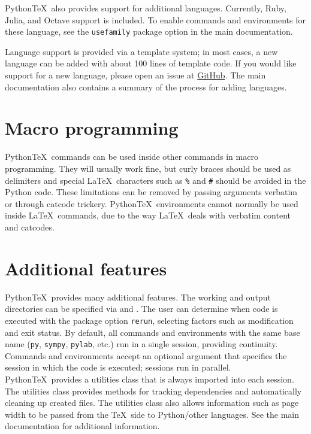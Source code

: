 \documentclass[twocolumn]{article}
\newcommand{\pytex}{Python\TeX}
\begin{document}
{\pytex\ also provides support for additional languages.  Currently, Ruby, Julia, and Octave support is included.  To enable commands and environments for these language, see the \texttt{usefamily} package option in the main documentation.

Language support is provided via a template system; in most cases, a new language can be added with about 100 lines of template code.  If you would like support for a new language, please open an issue at \href{https://github.com/gpoore/pythontex}{GitHub}.  The main documentation also contains a summary of the process for adding languages.

\section*{Macro programming}

\pytex\ commands can be used inside other commands in macro programming.  They will usually work fine, but curly braces should be used as delimiters and special \LaTeX\ characters such as \texttt{\%} and \texttt{\#} should be avoided in the Python code.  These limitations can be removed by passing arguments verbatim or through catcode trickery.  \pytex\ environments cannot normally be used inside \LaTeX\ commands, due to the way \LaTeX\ deals with verbatim content and catcodes.


\section*{Additional features}

\pytex\ provides many additional features.  The working and output directories can be specified via  and .  The user can determine when code is executed with the package option \texttt{rerun}, selecting factors such as modification and exit status.  By default, all commands and environments with the same base name (\texttt{py}, \texttt{sympy}, \texttt{pylab}, etc.) run in a single session, providing continuity.  Commands and environments accept an optional argument that specifies the session in which the code is executed; sessions run in parallel.  \pytex\ provides a utilities class that is always imported into each session.  The utilities class provides methods for tracking dependencies and automatically cleaning up created files.  The utilities class also allows information such as page width to be passed from the \TeX\ side to Python/other languages.  See the main documentation for additional information.

}
\end{document}
